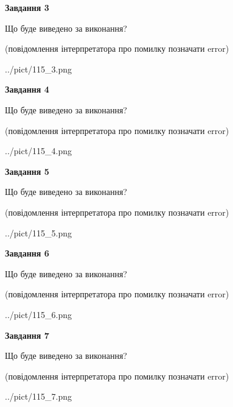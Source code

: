 \documentclass[12pt, ukrainian]{article}
\begin{document}
{\begin {large}
{\begin {center}\textbf{Завдання 3}\end {center}}\par
Що буде виведено за виконання?\par
 (повідомлення інтерпретатора про помилку позначати error)\par
\begin{center}
	{../pict/115_3.png}
\end{center}
\newpage

{\begin {center}\textbf{Завдання 4}\end {center}}\par
Що буде виведено за виконання?\par
 (повідомлення інтерпретатора про помилку позначати error)\par
\begin{center}
	{../pict/115_4.png}
\end{center}
\newpage

{\begin {center}\textbf{Завдання 5}\end {center}}\par
Що буде виведено за виконання?\par
 (повідомлення інтерпретатора про помилку позначати error)\par
\begin{center}
	{../pict/115_5.png}
\end{center}
\newpage

{\begin {center}\textbf{Завдання 6}\end {center}}\par
Що буде виведено за виконання?\par
 (повідомлення інтерпретатора про помилку позначати error)\par
\begin{center}
	{../pict/115_6.png}
\end{center}
\newpage

{\begin {center}\textbf{Завдання 7}\end {center}}\par
Що буде виведено за виконання?\par
 (повідомлення інтерпретатора про помилку позначати error)\par
\begin{center}
	{../pict/115_7.png}
\end{center}
\newpage


\end{large}}
\end{document}
